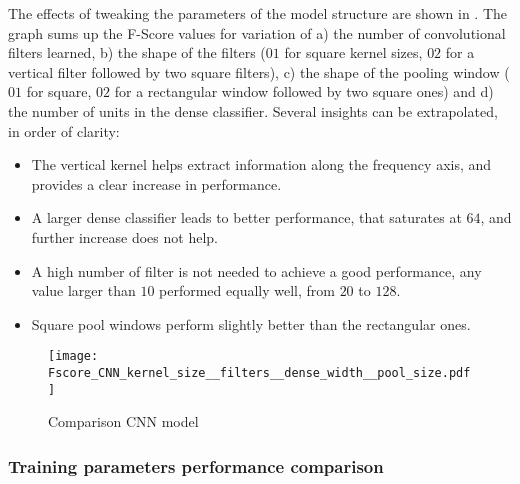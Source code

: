 The effects of tweaking the parameters of the model structure are shown in
.
The graph sums up the F-Score values for variation of
a)
the number of convolutional filters learned,
b)
the shape of the filters ($01$ for square kernel sizes, $02$ for a vertical
filter followed by two square filters),
c)
the shape of the pooling window ($01$ for square, $02$ for a rectangular
window followed by two square ones)
and
d)
the number of units in the dense classifier.
Several insights can be extrapolated, in order of clarity:
\begin{itemize}
    \item The vertical kernel helps extract information along the frequency axis,
        and provides a clear increase in performance.
    \item A larger dense classifier leads to better performance,
        that saturates at $64$, and further increase does not help.
    \item A high number of filter is not needed to achieve a good performance,
        any value larger than $10$ performed equally well, from $20$ to $128$.
    \item Square pool windows perform slightly better than the rectangular ones.
\end{itemize}


\begin{figure*}[h!]
    \centering
    \texttt{[image: Fscore\_CNN\_kernel\_size\_\_filters\_\_dense\_width\_\_pool\_size.pdf]}
    \caption{Comparison CNN model}%
    \label{fig:cnn_comparison_kernel_filter_dense_pool}
\end{figure*}

\subsubsection{Training parameters performance comparison}


